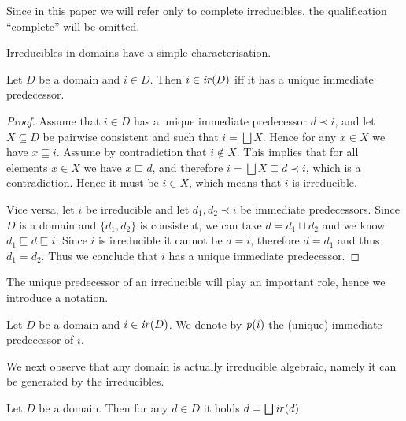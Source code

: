 Since in this paper we will refer only to complete irreducibles, the qualification ``complete'' will be omitted.



Irreducibles in domains have a simple characterisation.

\begin{lemma}
  \label{le:unique-pred}
  Let $D$ be a domain and $i \in D$. Then $i \in \mathop{\mathit{ir}({D})}$ 
  iff it has a unique immediate predecessor.
\end{lemma}


\begin{proof}
  Assume that $i \in D$ has a unique immediate predecessor
  $d \prec i$, and let $X \subseteq D$ be pairwise consistent and
  such that $ i = \bigsqcup X$. Hence for any $x \in X$ we have
  $x \sqsubseteq i$. Assume by contradiction that $i \not\in X$. This
  implies that for all elements $x \in X$ we have $x \sqsubseteq d$, and therefore
  $i= \bigsqcup X \sqsubseteq d \prec i$, which is a contradiction.
  Hence it must be $i \in X$, which means that $i$ is irreducible.

  Vice versa, let $i$ be irreducible and let $d_1, d_2 \prec i$ be
  immediate predecessors. Since $D$ is a domain and $\{ d_1, d_2 \}$
  is consistent, we can take $d = d_1 \sqcup d_2$ and we know
  $d_1 \sqsubseteq  d \sqsubseteq i$. Since $i$ is irreducible it cannot be
  $d = i$, therefore $d = d_1$ and thus $d_1 = d_2$. Thus we conclude that
  $i$ has a unique immediate predecessor.
\end{proof}

The unique predecessor of an irreducible will play an important role, hence we introduce a notation.

\begin{definition}
  Let $D$ be a domain and $i \in \mathop{\mathit{ir}({D})}$. We denote by $\mathit{p}({i})$ the
  (unique) immediate predecessor of $i$.
\end{definition}

We next observe that any domain is actually irreducible algebraic, namely it can be generated by the irreducibles.

\begin{proposition}
  \label{pr:domains-irr-alg}
  Let $D$ be a domain. Then for any $d \in D$ it holds
  $d = \bigsqcup \mathop{\mathit{ir}({d})}$.
\end{proposition}

